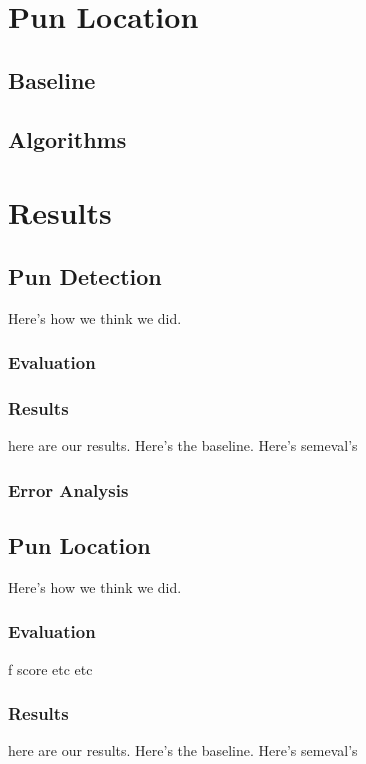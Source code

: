 \documentclass{article}
\begin{document}
\section{Pun Location}\label{pun_location}

\subsection{Baseline}

\subsection{Algorithms}

\section{Results}\label{results}

\subsection{Pun Detection}
Here's how we think we did.
\subsubsection{Evaluation}
\subsubsection{Results}
here are our results. Here's the baseline. Here's semeval's

\subsubsection{Error Analysis}

\subsection{Pun Location}
Here's how we think we did.
\subsubsection{Evaluation}
f score etc etc
\subsubsection{Results}
here are our results. Here's the baseline. Here's semeval's
\end{document}
